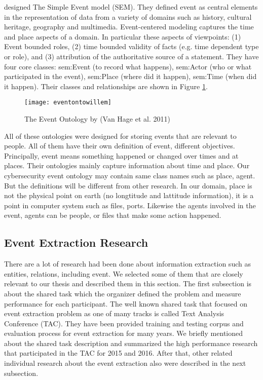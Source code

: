 \indent \cite{van2011design} designed The Simple Event model (SEM). They defined event as central elements in the representation of data from a variety of domains such as history, cultural heritage, geography and multimedia. Event-centered modeling captures the time and place aspects of a domain. In particular these aspects of viewpoints: (1) Event bounded roles, (2) time bounded validity of facts (e.g. time dependent type or role), and (3) attribution of the authoritative source of a statement. They have four core classes: sem:Event (to record what happens), sem:Actor (who or what participated in the event), sem:Place (where did it happen), sem:Time (when did it happen). Their classes and relationships are shown in Figure \ref{fig:eventontowillem}.\\
\begin{figure}[ht]
    \centering
    \texttt{[image: eventontowillem]}
    \caption{The Event Ontology by (Van Hage et al. 2011)}
    \label{fig:eventontowillem}
\end{figure}
\indent All of these ontologies were designed for storing events that are relevant to people. All of them have their own definition of event, different objectives. Principally, event means something happened or changed over times and at places. Their ontologies mainly capture information about time and place. Our cybersecurity event ontology may contain same class names such as place, agent. But the definitions will be different from other research. In our domain, place is not the physical point on earth (no longtitude and lattitude information), it is a point in computer system such as files, ports. Likewise the agents involved in the event, agents can be people, or files that make some action happened. 
\subsection{Event Extraction Research}
\label{eventextractionresearch}
There are a lot of research had been done about information extraction such as entities, relations, including event. We selected some of them that are closely relevant to our thesis and described them in this section. The first subsection is about the shared task which the organizer defined the problem and measure performance for each participant. The well known shared task that focused on event extraction problem as one of many tracks is called Text Analysis Conference (TAC). They have been provided training and testing corpus and evaluation process for event extraction for many years. We briefly mentioned about the shared task description and summarized the high performance research that participated in the TAC for 2015 and 2016. After that, other related individual research about the event extraction also were described in the next subsection.
